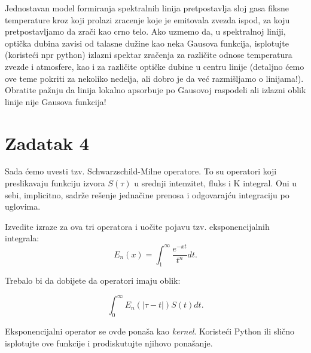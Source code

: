 \documentclass[12pt]{article}
\begin{document}
Jednostavan model formiranja spektralnih linija pretpostavlja sloj gasa fiksne temperature kroz koji prolazi zracenje koje je emitovala zvezda ispod, za koju pretpostavljamo da zra\v{c}i kao crno telo. Ako uzmemo da, u spektralnoj liniji, opti\v{c}ka dubina zavisi od talasne du\v{z}ine kao neka Gausova funkcija, isplotujte (koristeći npr python) izlazni spektar zračenja za različite odnose temperatura zvezde i atmosfere, kao i za različite optičke dubine u centru linije (detaljno ćemo ove teme pokriti za nekoliko nedelja, ali dobro je da već razmišljamo o linijama!). Obratite pa\v{z}nju da linija lokalno apsorbuje po Gausovoj raspodeli ali izlazni oblik linije nije Gausova funkcija!

\section{Zadatak 4}
Sada \'{c}emo uvesti tzv. Schwarzschild-Milne operatore. To su operatori koji preslikavaju funkciju izvora $S(\tau)$ u srednji intenzitet, fluks i K integral. Oni u sebi, implicitno, sadr\v{z}e re\v{s}enje jedna\v{c}ine prenosa i odgovaraj\'{c}u integraciju po uglovima. 

Izvedite izraze za ova tri operatora i uo\v{c}ite pojavu tzv. eksponencijalnih integrala:
\begin{equation}
E_n(x) = \int_1^{\infty} \frac{e^{-xt}}{t^n} dt.
\end{equation}

Trebalo bi da dobijete da operatori imaju oblik: 

\begin{equation}
\int_0^{\infty} E_n(|\tau-t|) S(t) dt.
\end{equation}

Eksponencijalni operator se ovde pona\v{s}a kao \emph{kernel}. Koriste\'{c}i Python ili sli\v{c}no isplotujte ove funkcije i prodiskutujte njihovo pona\v{s}anje. 
\end{document}
